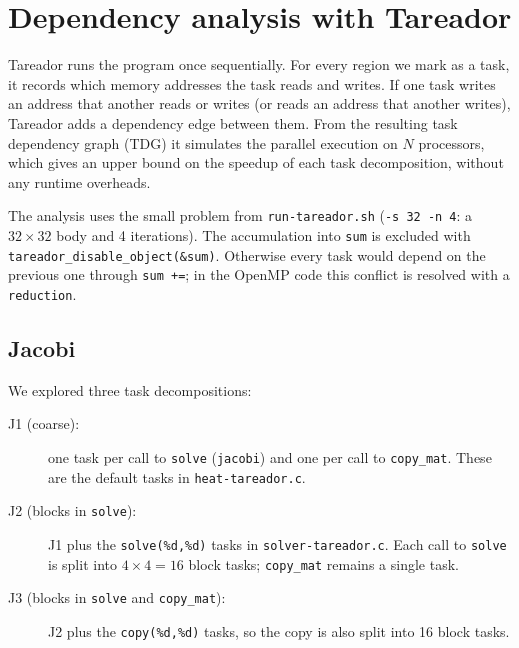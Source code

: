 \documentclass[11pt,a4paper]{article}
\begin{document}
\section{Dependency analysis with Tareador}

Tareador runs the program once sequentially. For every region we mark as a task, it records which memory addresses the task reads and writes. If one task writes an address that another reads or writes (or reads an address that another writes), Tareador adds a dependency edge between them. From the resulting task dependency graph (TDG) it simulates the parallel execution on $N$ processors, which gives an upper bound on the speedup of each task decomposition, without any runtime overheads.

The analysis uses the small problem from \texttt{run-tareador.sh} (\texttt{-s 32 -n 4}: a $32\times32$ body and 4 iterations). The accumulation into \texttt{sum} is excluded with \texttt{tareador\_disable\_object(\&sum)}. Otherwise every task would depend on the previous one through \texttt{sum +=}; in the OpenMP code this conflict is resolved with a \texttt{reduction}.

\subsection{Jacobi}

We explored three task decompositions:
\begin{description}
  \item[J1 (coarse):] one task per call to \texttt{solve} (\texttt{jacobi}) and one per call to \texttt{copy\_mat}. These are the default tasks in \texttt{heat-tareador.c}.
  \item[J2 (blocks in \texttt{solve}):] J1 plus the \texttt{solve(\%d,\%d)} tasks in \texttt{solver-tareador.c}. Each call to \texttt{solve} is split into $4\times4=16$ block tasks; \texttt{copy\_mat} remains a single task.
  \item[J3 (blocks in \texttt{solve} and \texttt{copy\_mat}):] J2 plus the \texttt{copy(\%d,\%d)} tasks, so the copy is also split into 16 block tasks.
\end{description}
\end{document}
